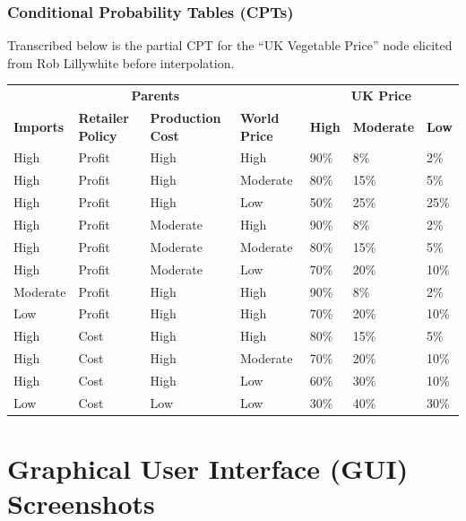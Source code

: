 \documentclass[12pt,notitlepage]{article}
\begin{document}
\subsubsection{Conditional Probability Tables (CPTs)}\label{subsubsec:cptables1}
Transcribed below is the partial CPT for the ``UK Vegetable Price'' node elicited from Rob Lillywhite before interpolation.

\noindent\begin{tabularx}{\textwidth}{
p{}p{}p{}p{}p{}p{}p{}}  
\toprule
\multicolumn{4}{c}{\textbf{Parents}}	& \multicolumn{3}{c}{\textbf{UK Price}}\\
\cline{5-7}
\textbf{Imports} & \textbf{Retailer Policy} & \textbf{Production Cost} & \textbf{World Price} & \textbf{High} & \textbf{Moderate} & \textbf{Low}\\
\midrule
High & Profit & High & High & 90\% & 8\% & 2\%\\
High & Profit & High & Moderate & 80\% & 15\% & 5\%\\
High & Profit & High & Low & 50\% & 25\% & 25\%\\
High & Profit & Moderate & High & 90\% & 8\% & 2\%\\
High & Profit & Moderate & Moderate & 80\% & 15\% & 5\%\\
High & Profit & Moderate & Low & 70\% & 20\% & 10\%\\
Moderate & Profit & High & High & 90\% & 8\% & 2\%\\
Low & Profit & High & High & 70\% & 20\% & 10\%\\
High & Cost & High & High & 80\% & 15\% & 5\%\\
High & Cost & High & Moderate & 70\% & 20\% & 10\%\\
High & Cost & High & Low & 60\% & 30\% & 10\%\\
Low & Cost & Low & Low & 30\% & 40\% & 30\%\\
\bottomrule
\end{tabularx}
\clearpage
\section{Graphical User Interface (GUI) Screenshots}\label{sec:screens}
\end{document}
